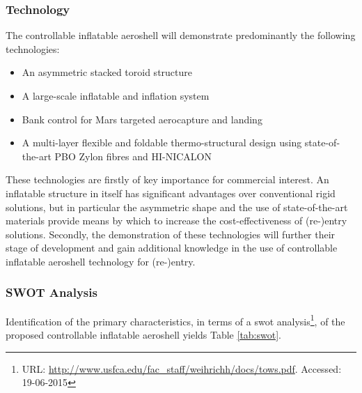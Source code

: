 \subsubsection{Technology}
The controllable inflatable aeroshell will demonstrate predominantly the following technologies:
\begin{itemize}
\item An asymmetric stacked toroid structure
\item A large-scale inflatable and inflation system
\item Bank control for Mars targeted aerocapture and landing
\item A multi-layer flexible and foldable thermo-structural design using state-of-the-art PBO Zylon fibres and HI-NICALON
\end{itemize}
These technologies are firstly of key importance for commercial interest. An inflatable structure in itself has significant advantages over conventional rigid solutions, but in particular the asymmetric shape and the use of state-of-the-art materials provide means by which to increase the cost-effectiveness of (re-)entry solutions. Secondly, the demonstration of these technologies will further their stage of development and gain additional knowledge in the use of controllable inflatable aeroshell technology for (re-)entry.


\subsubsection{SWOT Analysis}
Identification of the primary characteristics, in terms of a \gls{swot} analysis\footnote{URL: \url{http://www.usfca.edu/fac_staff/weihrichh/docs/tows.pdf}. Accessed: 19-06-2015}, of the proposed controllable inflatable aeroshell yields Table \ref{tab:swot}.

